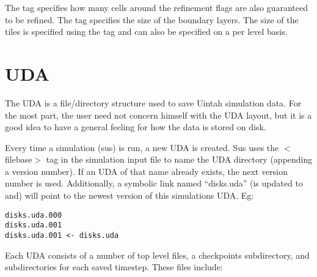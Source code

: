 The  tag specifies how many cells around
the refinement flags are also guaranteed to be refined.  The
 tag specifies the size of the boundary layers. 
The size of the tiles is specified using the  tag
and can also be specified on a per level basis.

%


\section{UDA}


The UDA is a file/directory structure used to save Uintah simulation
data.  For the most part, the user need not concern himself with the
UDA layout, but it is a good idea to have a general feeling for how
the data is stored on disk.


Every time a simulation (sus) is run, a new UDA is created.  Sus uses
the $<$filebase$>$ tag in the simulation input file to name the UDA
directory (appending a version number).  If an UDA of that name
already exists, the next version number is used.  Additionally, a
symbolic link named ``disks.uda'' (is updated to and) will point to
the newest version of this simulations UDA.  Eg:

\begin{Verbatim}[fontsize=\footnotesize]
disks.uda.000
disks.uda.001
disks.uda.001 <- disks.uda
\end{Verbatim}


Each UDA consists of a number of top level files, a checkpoints
subdirectory, and subdirectories for each saved timestep.  These files
include:


